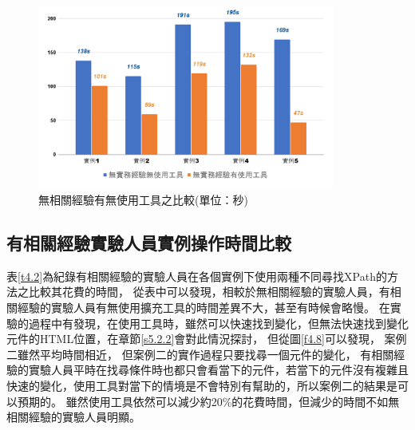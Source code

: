 \begin{figure}[H]
    \centering
    \setlength{\abovecaptionskip}{-15pt}
    \setlength{\belowcaptionskip}{0pt}
    \includegraphics[width=0.87\textwidth]{picture/experiment/ch4-no_experience_compare.png}
    \caption{無相關經驗有無使用工具之比較(單位：秒)}
    \label{f4.7}
\end{figure}

\subsection{有相關經驗實驗人員實例操作時間比較}\label{s4.3.2}
表\ref{t4.2}為紀錄有相關經驗的實驗人員在各個實例下使用兩種不同尋找XPath的方法之比較其花費的時間，
從表中可以發現，相較於無相關經驗的實驗人員，有相關經驗的實驗人員有無使用擴充工具的時間差異不大，甚至有時候會略慢。
在實驗的過程中有發現，在使用工具時，雖然可以快速找到變化，但無法快速找到變化元件的HTML位置，在章節\ref{s5.2.2}會對此情況探討，
但從圖\ref{f4.8}可以發現，
案例二雖然平均時間相近，
但案例二的實作過程只要找尋一個元件的變化，
有相關經驗的實驗人員平時在找尋條件時也都只會看當下的元件，若當下的元件沒有複雜且快速的變化，使用工具對當下的情境是不會特別有幫助的，所以案例二的結果是可以預期的。
雖然使用工具依然可以減少約20\%的花費時間，但減少的時間不如無相關經驗的實驗人員明顯。

